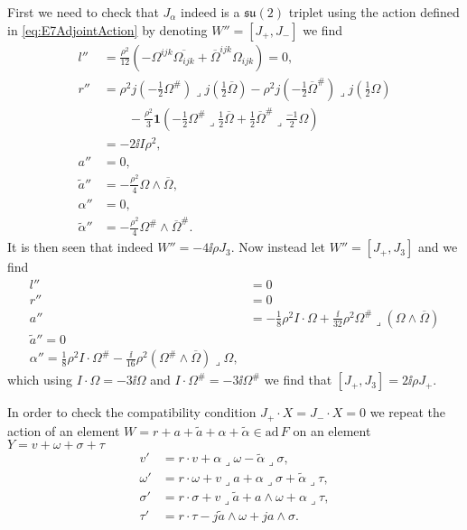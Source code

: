 First we need to check that $J_\alpha$ indeed is a $\mathfrak{su}(2)$ triplet using the action defined in \eqref{eq:E7AdjointAction} by denoting $W''=[J_+,J_-]$ we find 
\begin{equation}
    \begin{aligned}
        l''&= \frac{\rho^2}{12}(-\Omega^{ijk}\overbar{\Omega_{ijk}}+\overbar{\Omega}^{ijk}\Omega_{ijk}) = 0,\\
        r''&= \rho^2j(-\frac{1}{2}\Omega^{\#})\lrcorner j(\frac{1}{2}\overbar{\Omega})-\rho^2j(-\frac{1}{2}\overbar{\Omega}^{\#})\lrcorner j(\frac{1}{2}\Omega)\\
        &\qquad -\frac{\rho^2}{3}\mathbf{1}(-\frac{1}{2}\Omega^{\#}\lrcorner\frac{1}{2}\overbar{\Omega}+\frac{1}{2}\overbar{\Omega}^{\#}\lrcorner\frac{-1}{2}\Omega)\\
        &= -2\ii I\rho^2,\\
        a''&=0,\\
        \tilde{a}'' &= -\frac{\rho^2}{4}\Omega\wedge\overbar{\Omega},\\
        \alpha'' &= 0,\\
        \tilde{\alpha}'' &= -\frac{\rho^2}{4}\Omega^{\#}\wedge\overbar{\Omega}^{\#}.
    \end{aligned}
\end{equation}
It is then seen that indeed $W''=-4\ii\rho J_3$. Now instead let $W''=[J_+,J_3]$ and we find 
\begin{equation}
    \begin{aligned}
        l'' &= 0\\
        r'' &= 0\\
        a'' &= -\frac{1}{8}\rho^2 I\cdot \Omega+\frac{\ii}{32}\rho^2\Omega^{\#}\lrcorner (\Omega\wedge\overbar{\Omega})\\
        \tilde{a}'' = 0\\
        \alpha '' = \frac{1}{8}\rho^2 I\cdot \Omega^{\#}-\frac{\ii}{16}\rho^2(\Omega^{\#}\wedge\overbar{\Omega})\lrcorner\Omega,
    \end{aligned}
\end{equation}
which using $I\cdot \Omega=-3\ii\Omega$ and $I\cdot \Omega^{\#}=-3\ii\Omega^{\#}$ we find that $[J_+,J_3]=2\ii\rho J_+$. 

In order to check the compatibility condition $J_+\cdot X=J_-\cdot X=0$ we repeat the action of an element $W=r+a+\tilde{a}+\alpha+\tilde{\alpha}\in\text{ad}\,F$ on an element $Y=v+\omega+\sigma+\tau$
\begin{equation}\label{eq:E7action}
    \begin{aligned}
        v'&= r\cdot v+\alpha\lrcorner\omega-\tilde{\alpha}\lrcorner\sigma,\\
        \omega'&=r\cdot \omega+v\lrcorner a+\alpha\lrcorner\sigma+\tilde{\alpha}\lrcorner\tau,\\
        \sigma'&= r\cdot \sigma+v\lrcorner\tilde{a}+a\wedge\omega+\alpha\lrcorner\tau,\\
        \tau'&= r\cdot\tau-j\tilde{a}\wedge\omega+ja\wedge\sigma.
    \end{aligned}
\end{equation}

